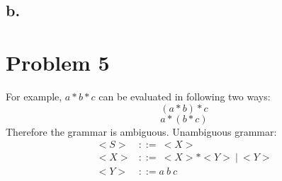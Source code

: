 \documentclass[12pt, a4paper]{article}
\begin{document}
\subsection*{b.}
\begin{center}
\end{center}

\section*{Problem 5}
For example, $a * b * c$ can be evaluated in following two ways:
$$(a * b) * c$$
$$a * (b * c)$$
Therefore the grammar is ambiguous.
Unambiguous grammar:
\begin{align*}
	<S> &::=\ <X> \\
	<X> &::=\ <X> * <Y>\ |\ <Y> \\
	<Y> &::= a\ b\ c
\end{align*}
\end{document}
